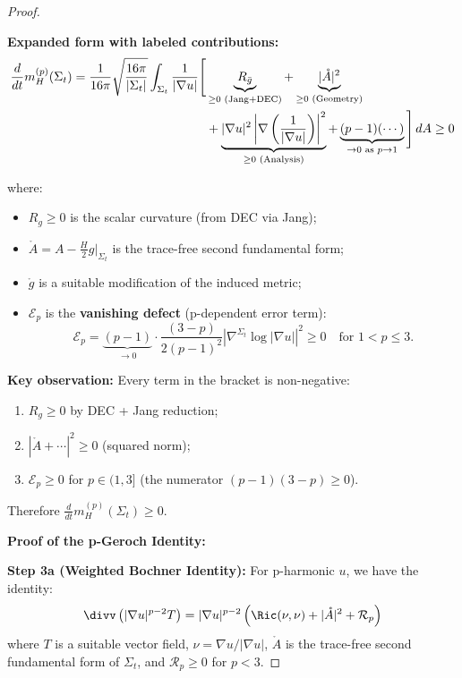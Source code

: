 \begin{proof}
\begin{remark}
\textbf{Expanded form with labeled contributions:}
\begin{align}\label{eq:p-Geroch-expanded}
\frac{d}{dt} m_H^{(p)}(\Sigma_t) = \frac{1}{16\pi} \sqrt{\frac{16\pi}{|\Sigma_t|}} \int_{\Sigma_t} \frac{1}{|\nabla u|} \Bigg[ & \underbrace{R_{\bar{g}}}_{\geq 0 \text{ (Jang+DEC)}} + \underbrace{|\mathring{A}|^2}_{\geq 0 \text{ (Geometry)}} \notag \\
& + \underbrace{|\nabla u|^2 \left| \nabla \left( \frac{1}{|\nabla u|} \right) \right|^2}_{\geq 0 \text{ (Analysis)}} + \underbrace{(p-1)(\cdots)}_{\to 0 \text{ as } p \to 1} \Bigg] \, dA \geq 0
\end{align}

where:
\begin{itemize}
\item $R_g \geq 0$ is the scalar curvature (from DEC via Jang);
\item $\mathring{A} = A - \frac{H}{2}g|_{\Sigma_t}$ is the trace-free second fundamental form;
\item $\mathring{g}$ is a suitable modification of the induced metric;
\item $\mathcal{E}_p$ is the \textbf{vanishing defect} (p-dependent error term):
\begin{equation}\label{eq:p-error}
\mathcal{E}_p = \underbrace{(p-1)}_{\to 0} \cdot \frac{(3-p)}{2(p-1)^2} \left| \nabla^{\Sigma_t} \log |\nabla u| \right|^2 \geq 0 \quad \text{for } 1 < p \leq 3.
\end{equation}
\end{itemize}

\textbf{Key observation:} Every term in the bracket is non-negative:
\begin{enumerate}
\item $R_g \geq 0$ by DEC + Jang reduction;
\item $|\mathring{A} + \cdots|^2 \geq 0$ (squared norm);
\item $\mathcal{E}_p \geq 0$ for $p \in (1, 3]$ (the numerator $(p-1)(3-p) \geq 0$).
\end{enumerate}
Therefore $\frac{d}{dt} m_H^{(p)}(\Sigma_t) \geq 0$.
\end{remark}

\textbf{Proof of the p-Geroch Identity:}

\textbf{Step 3a (Weighted Bochner Identity):} For p-harmonic $u$, we have the identity:
\begin{equation}
\divv\left(|\nabla u|^{p-2} T\right) = |\nabla u|^{p-2} \left(\Ric(\nu, \nu) + |\mathring{A}|^2 + \mathcal{R}_p\right)
\end{equation}
where $T$ is a suitable vector field, $\nu = \nabla u/|\nabla u|$, $\mathring{A}$ is the trace-free second fundamental form of $\Sigma_t$, and $\mathcal{R}_p \geq 0$ for $p < 3$.


\end{proof}
